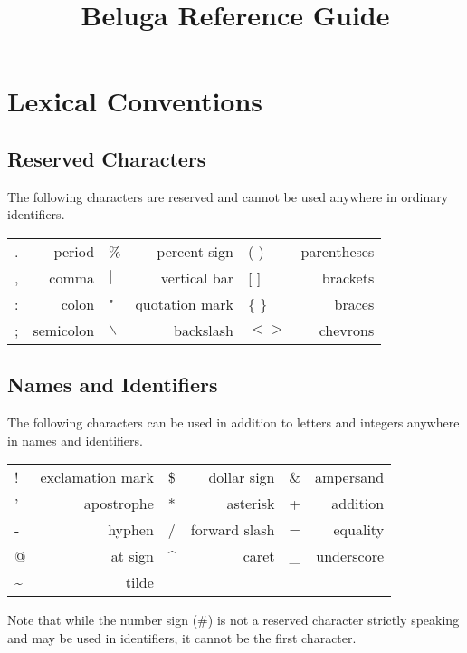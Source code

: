 \documentclass[11pt]{article}
\begin{document}
\title{Beluga Reference Guide}
\author{}
\date{}
\maketitle

\newpage

\section{Lexical Conventions}
\subsection{Reserved Characters}
The following characters are reserved and cannot be used anywhere in ordinary identifiers.
\begin{center}
\begin{tabular}{ | l r | l r | l r }
  . & period & \% & percent sign &  ( )  & parentheses \\
 , & comma & $\vert$ & vertical bar & [ ] & brackets\\
: & colon &  " & quotation mark  & \{ \} & braces  \\ 
; & semicolon & $\backslash$ & backslash  & $< >$ & chevrons  \\
\end{tabular}
\end{center}

\subsection{Names and Identifiers}
The following characters can be used in addition to letters and integers anywhere in names and identifiers.
\begin{center}
\begin{tabular}{ | l r | l r | l r }
 ! & exclamation mark & \$ & dollar sign & \& & ampersand\\
' & apostrophe &  * & asterisk  & + & addition \\
- & hyphen & / & forward slash  & = & equality  \\
@ & at sign & \^{} & caret  &  \_  & underscore  \\
\~{} & tilde &\\
\end{tabular}
\end{center}
Note that while the number sign (\#) is not a reserved  character strictly speaking and may be used in identifiers, it cannot be the first character.  
\end{document}
